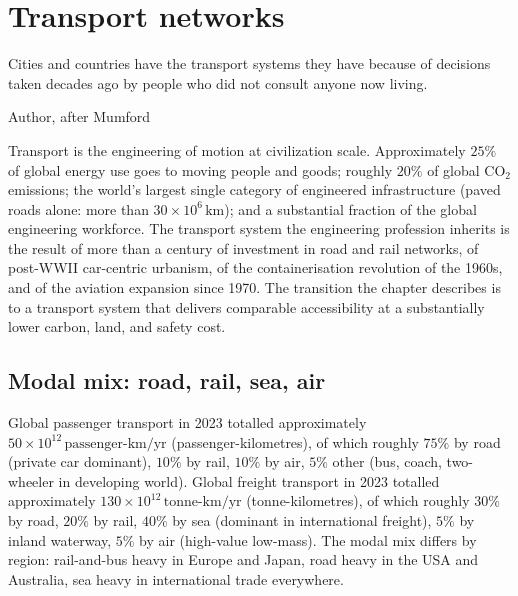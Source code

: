\chapter{Transport networks}
\label{vol12:ch04}

\epigraph{Cities and countries have the transport systems they have because of decisions taken decades ago by people who did not consult anyone now living.}{Author, after Mumford}


\noindent
Transport is the engineering of motion at civilization scale. Approximately $25\%$ of global energy use goes to moving people and goods; roughly $20\%$ of global CO$_2$ emissions; the world's largest single category of engineered infrastructure (paved roads alone: more than $30 \times 10^6\,\text{km}$); and a substantial fraction of the global engineering workforce. The transport system the engineering profession inherits is the result of more than a century of investment in road and rail networks, of post-WWII car-centric urbanism, of the containerisation revolution of the 1960s, and of the aviation expansion since 1970. The transition the chapter describes is to a transport system that delivers comparable accessibility at a substantially lower carbon, land, and safety cost.

\section{Modal mix: road, rail, sea, air}

Global passenger transport in 2023 totalled approximately $50 \times 10^{12}\,\text{passenger-km/yr}$ (passenger-kilometres), of which roughly $75\%$ by road (private car dominant), $10\%$ by rail, $10\%$ by air, $5\%$ other (bus, coach, two-wheeler in developing world). Global freight transport in 2023 totalled approximately $130 \times 10^{12}\,\text{tonne-km/yr}$ (tonne-kilometres), of which roughly $30\%$ by road, $20\%$ by rail, $40\%$ by sea (dominant in international freight), $5\%$ by inland waterway, $5\%$ by air (high-value low-mass). The modal mix differs by region: rail-and-bus heavy in Europe and Japan, road heavy in the USA and Australia, sea heavy in international trade everywhere.

